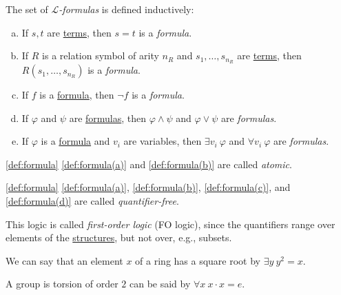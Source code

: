 \begin{definition}[Formula]\label{def:formula}
	The set of \emph{\(\mathcal{L} \)-formulas} is defined inductively:
	\begin{enumerate}[(a)]
		\item\label{def:formula(a)} If \(s, t\) are \hyperref[def:term]{terms}, then \(s=t\) is a \emph{formula}.
		\item\label{def:formula(b)} If \(R\) is a relation symbol of arity \(n_R\) and \(s_1, \ldots , s_{n_R}\) are \hyperref[def:term]{terms}, then \(R(s_1, \ldots , s_{n_R})\) is a \emph{formula}.
		\item\label{def:formula(c)} If \(f\) is a \hyperref[def:formula]{formula}, then \(\lnot f\) is a \emph{formula}.
		\item\label{def:formula(d)} If \(\varphi\) and \(\psi\) are \hyperref[def:formula]{formulas}, then \(\varphi \land \psi \) and \(\varphi \lor \psi \) are \emph{formulas}.
		\item\label{def:formula(e)} If \(\varphi \) is a \hyperref[def:formula]{formula} and \(v_i\) are variables, then \(\exists v_i \ \varphi \) and \(\forall v_i \ \varphi \) are \emph{formulas}.
	\end{enumerate}
\end{definition}

\begin{notation}[Atomic]\label{not:atomic}
	\autoref{def:formula} \autoref{def:formula(a)} and \autoref{def:formula(b)} are called \emph{atomic}.
\end{notation}

\begin{notation}\label{not:quantifier-free}
	\autoref{def:formula} \autoref{def:formula(a)}, \autoref{def:formula(b)}, \autoref{def:formula(c)}, and \autoref{def:formula(d)} are called \emph{quantifier-free}.
\end{notation}

This logic is called \emph{first-order logic} (FO logic), since the quantifiers range over elements of the \hyperref[def:structure]{structures}, but not over, e.g., subsets.

\begin{eg}
	We can say that an element \(x\) of a ring has a square root by \(\exists y\ y^2 = x\).
\end{eg}

\begin{eg}
	A group is torsion of order \(2\) can be said by \(\forall x\ x\cdot x = e\).
\end{eg}

